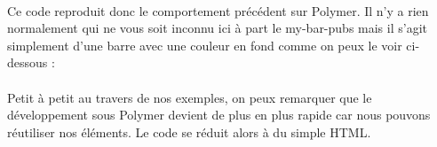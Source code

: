 \documentclass{article}
\begin{document}
\vspace{0.5cm}\\
Ce code reproduit donc le comportement pr\'ec\'edent sur Polymer. Il n'y a rien normalement qui ne vous soit inconnu ici \`a part le \og my-bar-pubs \fg{} mais il s'agit simplement d'une barre avec une couleur en fond comme on peux le voir ci-dessous : 
\vspace{0.5cm}\\
\vspace{0.5cm}\\

Petit \`a petit au travers de nos exemples, on peux remarquer que le d\'eveloppement sous Polymer devient de plus en plus rapide car nous pouvons r\'eutiliser nos \'el\'ements. Le code se r\'eduit alors \`a du simple HTML.
\end{document}
